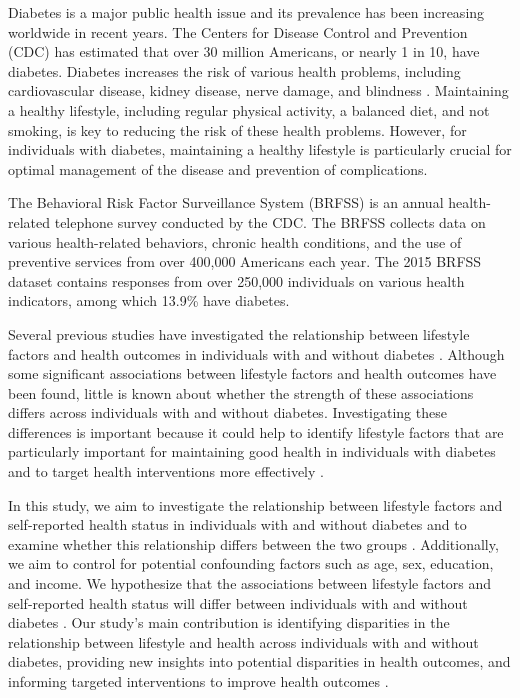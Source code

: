 \documentclass[12pt]{article}
\begin{document}
Diabetes is a major public health issue and its prevalence has been increasing worldwide in recent years. The Centers for Disease Control and Prevention (CDC) has estimated that over 30 million Americans, or nearly 1 in 10, have diabetes. Diabetes increases the risk of various health problems, including cardiovascular disease, kidney disease, nerve damage, and blindness \cite{Dunlop2014How, Meitei2019Transition}. Maintaining a healthy lifestyle, including regular physical activity, a balanced diet, and not smoking, is key to reducing the risk of these health problems. However, for individuals with diabetes, maintaining a healthy lifestyle is particularly crucial for optimal management of the disease and prevention of complications.

The Behavioral Risk Factor Surveillance System (BRFSS) is an annual health-related telephone survey conducted by the CDC. The BRFSS collects data on various health-related behaviors, chronic health conditions, and the use of preventive services from over 400,000 Americans each year. The 2015 BRFSS dataset contains responses from over 250,000 individuals on various health indicators, among which 13.9\% have diabetes.

Several previous studies have investigated the relationship between lifestyle factors and health outcomes in individuals with and without diabetes \cite{Guo2008PDB59, Wilson2017Motivational, Rondhianto2023Foot, Sato2012Work-related}. Although some significant associations between lifestyle factors and health outcomes have been found, little is known about whether the strength of these associations differs across individuals with and without diabetes. Investigating these differences is important because it could help to identify lifestyle factors that are particularly important for maintaining good health in individuals with diabetes and to target health interventions more effectively \cite{Dickerson2010Associations}.

In this study, we aim to investigate the relationship between lifestyle factors and self-reported health status in individuals with and without diabetes and to examine whether this relationship differs between the two groups \cite{Dickerson2010Associations}. Additionally, we aim to control for potential confounding factors such as age, sex, education, and income. We hypothesize that the associations between lifestyle factors and self-reported health status will differ between individuals with and without diabetes \cite{Qin2019Exploring}. Our study's main contribution is identifying disparities in the relationship between lifestyle and health across individuals with and without diabetes, providing new insights into potential disparities in health outcomes, and informing targeted interventions to improve health outcomes \cite{Soares2018Association, Kim2018Association, Sebekova2017Vitamin}.
\end{document}
